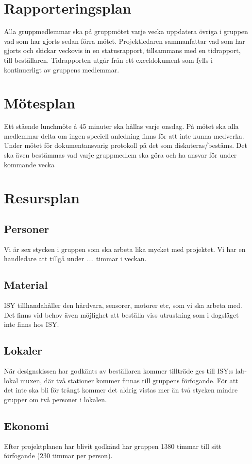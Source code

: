 \documentclass[11pt]{article}
\begin{document}
\begin{flushleft}
\pagebreak
\section{Rapporteringsplan}
Alla gruppmedlemmar ska på gruppmötet varje vecka uppdatera övriga i gruppen vad som har gjorts sedan förra mötet. Projektledaren sammanfattar vad som har gjorts och skickar veckovis in en statusrapport, tillsammans med en tidrapport, till beställaren. Tidrapporten utgår från ett exceldokument som fylls i kontinuerligt av gruppens medlemmar.

\pagebreak
\section{Mötesplan}
Ett stående lunchmöte á 45 minuter ska hållas varje onsdag. På mötet ska alla medlemmar delta om ingen speciell anledning finns för att inte kunna medverka. Under mötet för dokumentansvarig protokoll på det som diskuteras/bestäms. Det ska även bestämmas vad varje gruppmedlem ska göra och ha ansvar för under kommande vecka

\pagebreak
\section{Resursplan}
\subsection{Personer}
Vi är sex stycken i gruppen som ska arbeta lika mycket med projektet. Vi har en handledare att tillgå under .... timmar i veckan.

\subsection{Material}
ISY tillhandahåller den hårdvara, sensorer, motorer etc, som vi ska arbeta med. Det finns vid behov även möjlighet att beställa viss utrustning som i dagsläget inte finns hos ISY. 

\subsection{Lokaler}
När designskissen har godkänts av beställaren kommer tillträde ges till ISY:s lab-lokal muxen, där två stationer kommer finnas till gruppens förfogande. För att det inte ska bli för trångt kommer det aldrig vistas mer än två stycken mindre grupper om två personer i lokalen.

\subsection{Ekonomi}
Efter projektplanen har blivit godkänd har gruppen 1380 timmar till sitt förfogande (230 timmar per person).


\end{flushleft}
\end{document}
